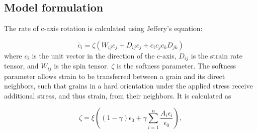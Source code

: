 \documentclass[a0,landscape]{a0poster}
\begin{document}
\begin{multicols}{3}




\subsection*{Model formulation}
The rate of c-axis rotation is calculated using Jeffery's equation:

\begin{equation}
   \dot{c_i} = \zeta \left( W_{ij}  c_j + D_{ij} c_j + c_i c_j c_k D_{jk} \right)
\end{equation}
where $c_i$ is the unit vector in the direction of the c-axis, $D_{ij}$ is the strain rate tensor, and $W_{ij}$ is the spin tensor. $\zeta$ is the softness parameter. The softness parameter allows strain to be transferred between a grain and its direct neighbors, such that grains in a hard orientation under the applied stress receive additional stress, and thus strain, from their neighbors. It is calculated as

\begin{equation}
\zeta = \xi \left( \left( 1 - \gamma \right)  \epsilon_0 + \gamma \sum_{i=1}^n \frac{A_i \epsilon_i}{\epsilon_0} \right),
\end{equation}


\end{multicols}
\end{document}
